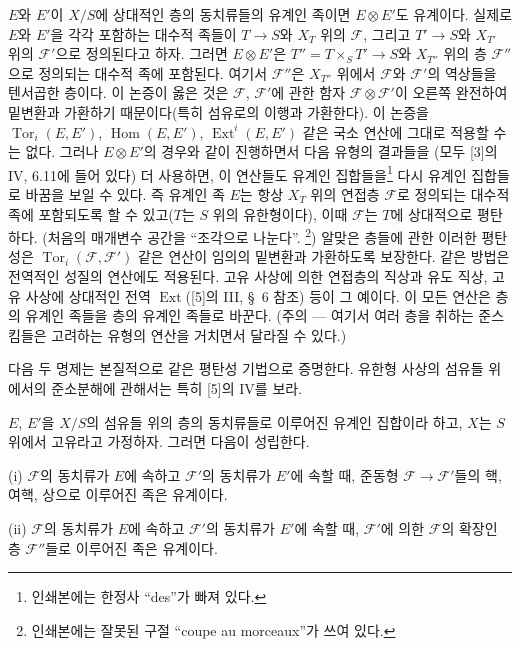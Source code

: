 $E$와 $E'$이 $X/S$에 상대적인 층의 동치류들의 유계인 족이면
$E\otimes E'$도 유계이다. 실제로 $E$와 $E'$을 각각 포함하는 대수적
족들이 $T\longrightarrow S$와 $X_T$ 위의 $\mathcal F$, 그리고
$T'\longrightarrow S$와 $X_{T'}$ 위의 $\mathcal F'$으로 정의된다고
하자. 그러면 $E\otimes E'$은 $T''=T\times_S T'\longrightarrow S$와
$X_{T''}$ 위의 층 $\mathcal F''$으로 정의되는 대수적 족에 포함된다.
여기서 $\mathcal F''$은 $X_{T''}$ 위에서 $\mathcal F$와 $\mathcal F'$의
역상들을 텐서곱한 층이다. 이 논증이 옳은 것은 $\mathcal F$, $\mathcal F'$에
관한 함자 $\mathcal F\otimes\mathcal F'$이 오른쪽 완전하여 밑변환과
가환하기 때문이다(특히 섬유로의 이행과 가환한다). 이 논증을
$\operatorname{Tor}_i(E,E')$, $\operatorname{Hom}(E,E')$,
$\operatorname{Ext}^i(E,E')$ 같은 국소 연산에 그대로 적용할 수는 없다.
그러나 $E\otimes E'$의 경우와 같이 진행하면서 다음 유형의 결과들을
(모두 [3]의 IV, 6.11에 들어 있다) 더 사용하면, 이 연산들도 유계인
집합들을\footnote{인쇄본에는 한정사 ``des''가
빠져 있다.} 다시 유계인 집합들로 바꿈을 보일 수 있다. 즉 유계인 족 $E$는
항상 $X_T$ 위의 연접층 $\mathcal F$로 정의되는 대수적 족에 포함되도록
할 수 있고($T$는 $S$ 위의 유한형이다), 이때 $\mathcal F$는 $T$에
상대적으로 평탄하다. (처음의 매개변수 공간을 ``조각으로
나눈다''.
\footnote{인쇄본에는 잘못된 구절 ``coupe au
morceaux''가 쓰여 있다.}) 알맞은 층들에 관한 이러한
평탄성은 $\operatorname{Tor}_i(\mathcal F,\mathcal F')$ 같은 연산이
임의의 밑변환과 가환하도록 보장한다. 같은 방법은 전역적인 성질의 연산에도
적용된다. 고유 사상에 의한 연접층의 직상과 유도 직상, 고유 사상에 상대적인
전역 $\operatorname{Ext}$([5]의 III, \S~6 참조) 등이 그 예이다. 이 모든
연산은 층의 유계인 족들을 층의 유계인 족들로 바꾼다. (주의 --- 여기서
여러 층을 취하는 준스킴들은 고려하는 유형의 연산을 거치면서 달라질 수 있다.)

다음 두 명제는 본질적으로 같은 평탄성 기법으로 증명한다. 유한형 사상의
섬유들 위에서의 준소분해에 관해서는 특히 [5]의 IV를 보라.

 $E$, $E'$을 $X/S$의 섬유들 위의 층의 동치류들로
이루어진 유계인 집합이라 하고, $X$는 $S$ 위에서 고유라고 가정하자. 그러면
다음이 성립한다.

\medskip
\noindent (i) $\mathcal F$의 동치류가 $E$에 속하고 $\mathcal F'$의
동치류가 $E'$에 속할 때, 준동형
$\mathcal F\longrightarrow\mathcal F'$들의 핵, 여핵, 상으로 이루어진
족은 유계이다.

\smallskip
\noindent (ii) $\mathcal F$의 동치류가 $E$에 속하고 $\mathcal F'$의
동치류가 $E'$에 속할 때, $\mathcal F'$에 의한 $\mathcal F$의 확장인
층 $\mathcal F''$들로 이루어진 족은 유계이다.

